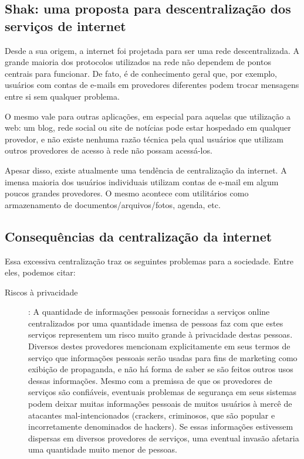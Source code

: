 \begin{anexosenv}

\partanexos

\chapter{Shak: uma proposta para descentralização dos serviços de internet}

Desde a sua origem, a internet foi projetada para ser uma rede
descentralizada. A grande maioria dos protocolos utilizados na rede não
dependem de pontos centrais para funcionar. De fato, é de conhecimento geral
que, por exemplo, usuários com contas de e-mails em provedores diferentes podem
trocar mensagens entre si sem qualquer problema.

O mesmo vale para outras aplicações, em especial para aquelas que utilização a
web: um blog, rede social ou site de notícias pode estar hospedado em
qualquer provedor, e não existe nenhuma razão técnica pela qual usuários que
utilizam outros provedores de acesso à rede não possam acessá-los.

Apesar disso, existe atualmente uma tendência de centralização da internet. A
imensa maioria dos usuários individuais utilizam contas de e-mail em algum
poucos grandes provedores. O mesmo acontece com utilitários como armazenamento
de documentos/arquivos/fotos, agenda, etc.

\section{Consequências da centralização da internet}

Essa excessiva centralização traz os seguintes problemas para a sociedade.
Entre eles, podemos citar:

\begin{description}
  \item [Riscos à privacidade]:  A quantidade de informações pessoais fornecidas 
  a serviços online
  centralizados por uma quantidade imensa de pessoas faz com que estes serviços
  representem um risco muito grande à privacidade destas pessoas. Diversos
  destes provedores mencionam explicitamente em seus termos de serviço que
  informações pessoais serão usadas para fins de marketing como exibição de
  propaganda, e não há forma de saber se são feitos outros usos dessas
  informações. Mesmo com a premissa de que os provedores de serviços são
  confiáveis, eventuais problemas de segurança em seus sistemas podem deixar
  muitas informações pessoais de muitos usuários à mercê de atacantes
  mal-intencionados (crackers, criminosos, que são popular e incorretamente
  denominados de hackers). Se essas informações estivessem dispersas em
  diversos provedores de serviços, uma eventual invasão afetaria uma quantidade
  muito menor de pessoas.


\end{description}
\end{anexosenv}
